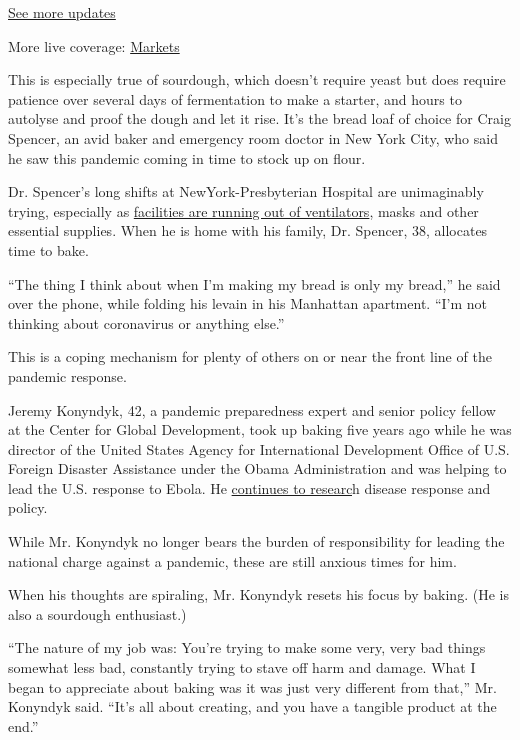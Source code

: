 \href{https://www.nytimes3xbfgragh.onion/2020/09/08/world/covid-19-coronavirus.html?action=click\&pgtype=Article\&state=default\&region=MAIN_CONTENT_1\&context=storylines_live_updates}{See
more updates}

More live coverage:
\href{https://www.nytimes3xbfgragh.onion/live/2020/09/08/business/stock-market-today-coronavirus?action=click\&pgtype=Article\&state=default\&region=MAIN_CONTENT_1\&context=storylines_live_updates}{Markets}

This is especially true of sourdough, which doesn't require yeast but
does require patience over several days of fermentation to make a
starter, and hours to autolyse and proof the dough and let it rise. It's
the bread loaf of choice for Craig Spencer, an avid baker and emergency
room doctor in New York City, who said he saw this pandemic coming in
time to stock up on flour.

Dr. Spencer's long shifts at NewYork-Presbyterian Hospital are
unimaginably trying, especially as
\href{https://www.nytimes3xbfgragh.onion/2020/03/26/nyregion/coronavirus-brooklyn-hospital.html}{facilities
are running out of ventilators}, masks and other essential supplies.
When he is home with his family, Dr. Spencer, 38, allocates time to
bake.

``The thing I think about when I'm making my bread is only my bread,''
he said over the phone, while folding his levain in his Manhattan
apartment. ``I'm not thinking about coronavirus or anything else.''

This is a coping mechanism for plenty of others on or near the front
line of the pandemic response.

Jeremy Konyndyk, 42, a pandemic preparedness expert and senior policy
fellow at the Center for Global Development, took up baking five years
ago while he was director of the United States Agency for International
Development Office of U.S. Foreign Disaster Assistance under the Obama
Administration and was helping to lead the U.S. response to Ebola. He
\href{https://www.nytimes3xbfgragh.onion/2020/03/07/opinion/trump-coronavirus-us.html}{continues
to researc}h disease response and policy.

While Mr. Konyndyk no longer bears the burden of responsibility for
leading the national charge against a pandemic, these are still anxious
times for him.

When his thoughts are spiraling, Mr. Konyndyk resets his focus by
baking. (He is also a sourdough enthusiast.)

``The nature of my job was: You're trying to make some very, very bad
things somewhat less bad, constantly trying to stave off harm and
damage. What I began to appreciate about baking was it was just very
different from that,'' Mr. Konyndyk said. ``It's all about creating, and
you have a tangible product at the end.''

